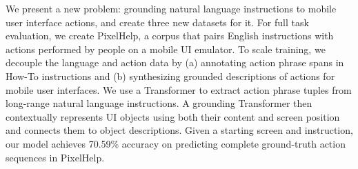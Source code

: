 We present a new problem: grounding natural language instructions to mobile user interface actions, and create three new datasets for it. For full task evaluation, we create PixelHelp, a corpus that pairs English instructions with actions performed by people on a mobile UI emulator. To scale training, we decouple the language and action data by (a) annotating action phrase spans in How-To instructions and (b) synthesizing grounded descriptions of actions for mobile user interfaces. We use a Transformer to extract action phrase tuples from long-range natural language instructions. A grounding Transformer then contextually represents UI objects using both their content and screen position and connects them to object descriptions. Given a starting screen and instruction, our model achieves 70.59\% accuracy on predicting complete ground-truth action sequences in PixelHelp.
